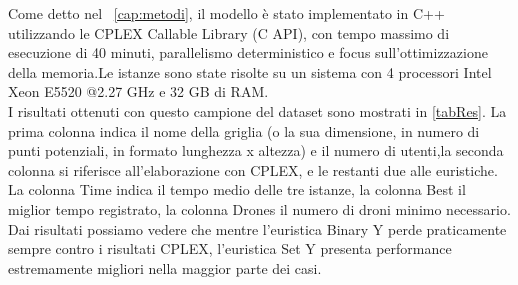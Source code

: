 Come detto nel \chaptername\ \ref{cap:metodi}, il modello è stato implementato in C++ utilizzando le CPLEX Callable Library (C API), con tempo massimo di esecuzione di 40 minuti, parallelismo deterministico e focus sull'ottimizzazione della memoria.Le istanze sono state risolte su un sistema con 4 processori Intel Xeon E5520 @2.27 GHz e 32 GB di RAM. \\
I risultati ottenuti con questo campione del dataset sono mostrati in \tablename \ref{tabRes}. La prima colonna indica il nome della griglia (o la sua dimensione, in numero di punti potenziali, in formato lunghezza x altezza) e il numero di utenti,la seconda colonna si riferisce all'elaborazione con CPLEX, e le restanti due alle euristiche. La colonna Time indica il tempo medio delle tre istanze, la colonna Best il miglior tempo registrato, la colonna Drones il numero di droni minimo necessario.  \\
Dai risultati possiamo vedere che mentre l'euristica Binary Y perde praticamente sempre contro i risultati CPLEX, l'euristica Set Y presenta performance estremamente migliori nella maggior parte dei casi. \\  

